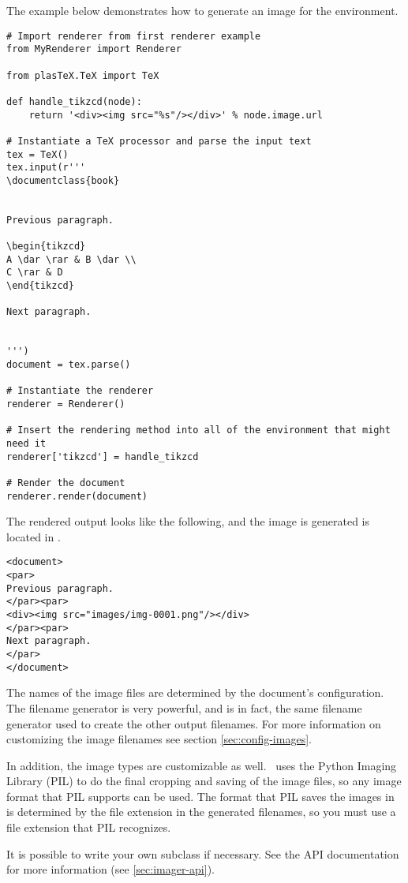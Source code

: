 The example below demonstrates how to generate an image for the
 environment.
\begin{verbatim}
# Import renderer from first renderer example
from MyRenderer import Renderer

from plasTeX.TeX import TeX

def handle_tikzcd(node):
    return '<div><img src="%s"/></div>' % node.image.url

# Instantiate a TeX processor and parse the input text
tex = TeX()
tex.input(r'''
\documentclass{book}


Previous paragraph.

\begin{tikzcd}
A \dar \rar & B \dar \\
C \rar & D
\end{tikzcd}

Next paragraph.


''')
document = tex.parse()

# Instantiate the renderer
renderer = Renderer()

# Insert the rendering method into all of the environment that might need it
renderer['tikzcd'] = handle_tikzcd

# Render the document
renderer.render(document)
\end{verbatim}

The rendered output looks like the following, and the image is generated
is located in .
\begin{verbatim}
<document>
<par>
Previous paragraph.
</par><par>
<div><img src="images/img-0001.png"/></div>
</par><par>
Next paragraph.
</par>
</document>
\end{verbatim}

The names of the image files are determined by the document's configuration.
The filename generator is very powerful, and is in fact, the same filename
generator used to create the other output filenames.  For more information
on customizing the image filenames see section \ref{sec:config-images}.

In addition, the image types are customizable as well.  \plasTeX\ uses
the Python Imaging Library (PIL) to do the final cropping and saving of the
image files, so any image format that PIL supports can be used.  The
format that PIL saves the images in is determined by the file extension
in the generated filenames, so you must use a file extension that
PIL recognizes.

It is possible to write your own  subclass if necessary.
See the  API documentation for more information (see
\ref{sec:imager-api}).


